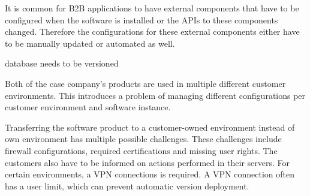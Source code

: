 \documentclass[english]{tktltiki2}
\theoremstyle{definition}
\theoremstyle{remark}
\begin{document}




It is common for B2B applications to have external components that have to be configured when the software is installed or the APIs to these components changed. Therefore the configurations for these external components either have to be manually updated or automated as well.


database needs to be versioned

Both of the case company's products are used in multiple different customer environments. This introduces a problem of managing different configurations per customer environment and software instance. 


Transferring the software product to a customer-owned environment instead of own environment has multiple possible challenges. These challenges include firewall configurations, required certifications and missing user rights. The customers also have to be informed on actions performed in their servers. For certain environments, a VPN connections is required. A VPN connection often has a user limit, which can prevent automatic version deployment.
\end{document}
